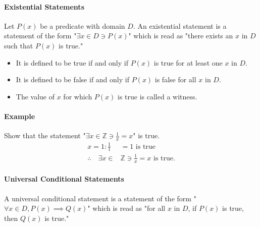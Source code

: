\pagebreak

\paragraph*{Existential Statements}
Let $P(x)$ be a predicate with domain $D$. An existential statement is a statement of the form
"$\exists x \in D \ni P(x)$" which is read as "there exists an $x$ in $D$ such that $P(x)$ is true."
\begin{itemize}
    \item It is defined to be true if and only if $P(x)$ is true for at least one $x$ in $D$.
    \item It is defined to be false if and only if $P(x)$ is false for all $x$ in $D$.
    \item The value of $x$ for which $P(x)$ is true is called a witness.
\end{itemize}

\paragraph*{Example}
Show that the statement "$\exists x \in \mathbb{Z} \ni \frac{1}{x} = x$" is true.
\begin{align*}
    x = 1: \frac{1}{1} &= 1 \text{ is true}\\
    \therefore \quad \exists x \in &\mathbb{Z} \ni \frac{1}{x} = x \text{ is true.}
\end{align*}

\paragraph*{Universal Conditional Statements}
A universal conditional statement is a statement of the form "$\forall x \in D, P(x) \implies Q(x)$" 
which is read as "for all $x$ in $D$, if $P(x)$ is true, then $Q(x)$ is true."

